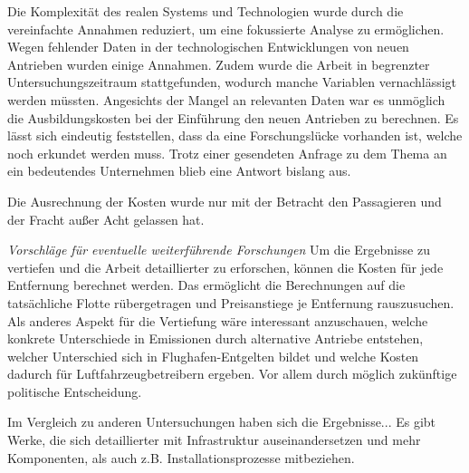 Die Komplexität des realen Systems und Technologien wurde durch die vereinfachte Annahmen reduziert, um eine fokussierte Analyse zu ermöglichen.
Wegen fehlender Daten in der technologischen Entwicklungen von neuen Antrieben wurden einige Annahmen.
Zudem wurde die Arbeit in begrenzter Untersuchungszeitraum stattgefunden, wodurch manche Variablen vernachlässigt werden müssten.
%
Angesichts der Mangel an relevanten Daten war es unmöglich die Ausbildungskosten bei der Einführung den neuen Antrieben zu berechnen.
Es lässt sich eindeutig feststellen, dass da eine Forschungslücke vorhanden ist, welche noch erkundet werden muss. 
Trotz einer gesendeten Anfrage zu dem Thema an ein bedeutendes Unternehmen blieb eine Antwort bislang aus.

Die Ausrechnung der Kosten wurde nur mit der Betracht den Passagieren und der Fracht außer Acht gelassen hat. 

\textit{Vorschläge für eventuelle weiterführende Forschungen}
Um die Ergebnisse zu vertiefen und die Arbeit detaillierter zu erforschen, können die Kosten für jede Entfernung berechnet werden.
Das ermöglicht die Berechnungen auf die tatsächliche Flotte rübergetragen und Preisanstiege je Entfernung rauszusuchen.
Als anderes Aspekt für die Vertiefung wäre interessant anzuschauen, welche konkrete Unterschiede in Emissionen durch 
alternative Antriebe entstehen, welcher Unterschied sich in Flughafen-Entgelten bildet und welche Kosten dadurch
für Luftfahrzeugbetreibern ergeben. Vor allem durch möglich zukünftige politische Entscheidung.

Im Vergleich zu anderen Untersuchungen haben sich die Ergebnisse...
Es gibt Werke, die sich detaillierter mit Infrastruktur auseinandersetzen und mehr Komponenten, als auch z.B. Installationsprozesse
mitbeziehen. %

